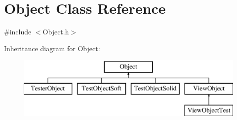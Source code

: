 \hypertarget{class_object}{\section{Object Class Reference}
\label{class_object}
}


{\ttfamily \#include $<$Object.\+h$>$}

Inheritance diagram for Object\+:\begin{figure}[H]
\begin{center}
\leavevmode
\includegraphics[height=3.000000cm]{class_object}
\end{center}
\end{figure}
